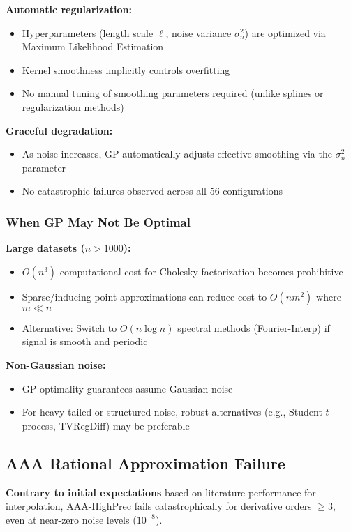 \textbf{Automatic regularization:}
\begin{itemize}
    \item Hyperparameters (length scale $\ell$, noise variance $\sigma^2_n$) are optimized via Maximum Likelihood Estimation
    \item Kernel smoothness implicitly controls overfitting
    \item No manual tuning of smoothing parameters required (unlike splines or regularization methods)
\end{itemize}

\textbf{Graceful degradation:}
\begin{itemize}
    \item As noise increases, GP automatically adjusts effective smoothing via the $\sigma^2_n$ parameter
    \item No catastrophic failures observed across all 56 configurations
\end{itemize}

\subsubsection{When GP May Not Be Optimal}

\textbf{Large datasets ($n > 1000$):}
\begin{itemize}
    \item $O(n^3)$ computational cost for Cholesky factorization becomes prohibitive
    \item Sparse/inducing-point approximations can reduce cost to $O(nm^2)$ where $m \ll n$
    \item Alternative: Switch to $O(n \log n)$ spectral methods (Fourier-Interp) if signal is smooth and periodic
\end{itemize}

\textbf{Non-Gaussian noise:}
\begin{itemize}
    \item GP optimality guarantees assume Gaussian noise
    \item For heavy-tailed or structured noise, robust alternatives (e.g., Student-$t$ process, TVRegDiff) may be preferable
\end{itemize}

\subsection{AAA Rational Approximation Failure}
\label{sec:aaa_failure}

\textbf{Contrary to initial expectations} based on literature performance for interpolation, AAA-HighPrec fails catastrophically for derivative orders $\geq 3$, even at near-zero noise levels ($10^{-8}$).

